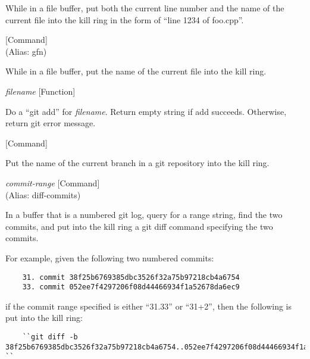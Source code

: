 \begin{doc-string}
While in a file buffer, put both the current line number and the name of the current
file into the kill ring in the form of ``line 1234 of foo.cpp''.
\end{doc-string}

\vspace{1em}
\noindent
{}
\usebox{\funcname}
 \hfill [Command]\\%
 (Alias: gfn)

\begin{doc-string}
While in a file buffer, put the name of the current file into the kill ring.
\end{doc-string}

\vspace{1em}
\noindent
{}
\usebox{\funcname}\emph{filename}
 \hfill [Function]

\begin{doc-string}
Do a ``git add'' for \emph{filename}.  Return empty string if add succeeds.  Otherwise,
return git error message.
\end{doc-string}

\vspace{1em}
\noindent
{}
\usebox{\funcname}
 \hfill [Command]

\begin{doc-string}
Put the name of the current branch in a git repository into the kill ring.
\end{doc-string}

\vspace{1em}
\noindent
{}
\usebox{\funcname}\emph{commit-range}
 \hfill [Command]\\%
 (Alias: diff-commits)

\begin{doc-string}
In a buffer that is a numbered git log, query for a range string, find the two
commits, and put into the kill ring a git diff command specifying the two commits.

For example, given the following two numbered commits:

\small{\begin{verbatim}
    31. commit 38f25b6769385dbc3526f32a75b97218cb4a6754
    33. commit 052ee7f4297206f08d44466934f1a52678da6ec9
\end{verbatim}}

if the commit range specified is either ``31.33'' or ``31+2'', then the following
is put into the kill ring:

\small{\begin{verbatim}
    ``git diff -b 38f25b6769385dbc3526f32a75b97218cb4a6754..052ee7f4297206f08d44466934f1a52678da6ec9 ``
\end{verbatim}}
\end{doc-string}

